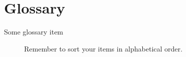 \section{Glossary}\label{sec:Glossary}
\newcommand{\ul}{\underline}
\begin{description}
\item[Some glossary item]Remember to sort your items in alphabetical order.
\end{description}
